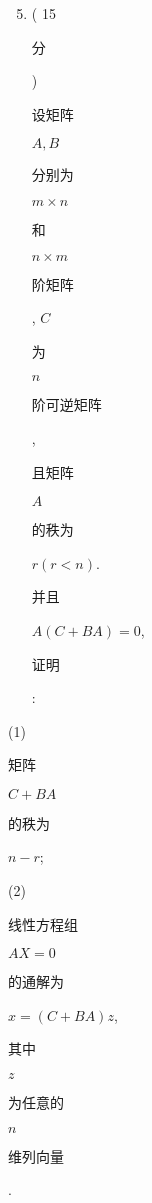 \documentclass[10pt]{article}
\begin{document}
\begin{enumerate}
  \setcounter{enumi}{4}
  \item ( 15 \begin{CJK}{UTF8}{mj}分\end{CJK}) \begin{CJK}{UTF8}{mj}设矩阵\end{CJK} $A, B$ \begin{CJK}{UTF8}{mj}分别为\end{CJK} $m \times n$ \begin{CJK}{UTF8}{mj}和\end{CJK} $n \times m$ \begin{CJK}{UTF8}{mj}阶矩阵\end{CJK}, $C$ \begin{CJK}{UTF8}{mj}为\end{CJK} $n$ \begin{CJK}{UTF8}{mj}阶可逆矩阵\end{CJK}, \begin{CJK}{UTF8}{mj}且矩阵\end{CJK} $A$ \begin{CJK}{UTF8}{mj}的秩为\end{CJK} $r(r<n)$. \begin{CJK}{UTF8}{mj}并且\end{CJK} $A(C+B A)=0$, \begin{CJK}{UTF8}{mj}证明\end{CJK}:
\end{enumerate}
(1) \begin{CJK}{UTF8}{mj}矩阵\end{CJK} $C+B A$ \begin{CJK}{UTF8}{mj}的秩为\end{CJK} $n-r$;

(2) \begin{CJK}{UTF8}{mj}线性方程组\end{CJK} $A X=0$ \begin{CJK}{UTF8}{mj}的通解为\end{CJK} $x=(C+B A) z$, \begin{CJK}{UTF8}{mj}其中\end{CJK} $z$ \begin{CJK}{UTF8}{mj}为任意的\end{CJK} $n$ \begin{CJK}{UTF8}{mj}维列向量\end{CJK}.
\end{document}
